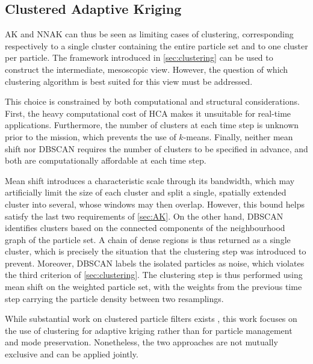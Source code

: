 \subsection{Clustered Adaptive Kriging}

AK and NNAK can thus be seen as limiting cases of clustering, corresponding respectively to a single cluster containing the entire particle set and to one cluster per particle. The framework introduced in \cref{sec:clustering} can be used to construct the intermediate, mesoscopic view. However, the question of which clustering algorithm is best suited for this view must be addressed. 

This choice is constrained by both computational and structural considerations. First, the heavy computational cost of HCA makes it unsuitable for real-time applications. Furthermore, the number of clusters at each time step is unknown prior to the mission, which prevents the use of $k$-means. Finally, neither mean shift nor DBSCAN requires the number of clusters to be specified in advance, and both are computationally affordable at each time step.

Mean shift introduces a characteristic scale through its bandwidth, which may artificially limit the size of each cluster and split a single, spatially extended cluster into several, whose windows may then overlap. However, this bound helps satisfy the last two requirements of \cref{sec:AK}. On the other hand, DBSCAN identifies clusters based on the connected components of the neighbourhood graph of the particle set. A chain of dense regions is thus returned as a single cluster, which is precisely the situation that the clustering step was introduced to prevent. Moreover, DBSCAN labels the isolated particles as noise, which violates the third criterion of \cref{sec:clustering}. The clustering step is thus performed using mean shift on the weighted particle set, with the weights from the previous time step carrying the particle density between two resamplings.

While substantial work on clustered particle filters exists \cite{bib:these-Murangira,bib:robust-RPF-TAN}, this work focuses on the use of clustering for adaptive kriging rather than for particle management and mode preservation. Nonetheless, the two approaches are not mutually exclusive and can be applied jointly.

